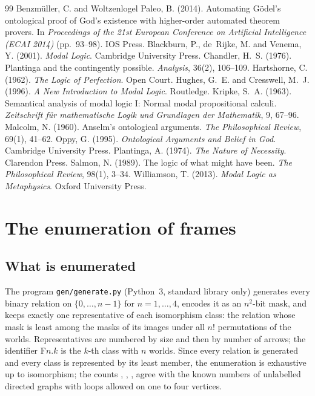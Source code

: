 \documentclass{situationist-preprint}
\begin{document}
\begin{thebibliography}{99}\small
{} Benzmüller, C. and Woltzenlogel Paleo, B. (2014). Automating Gödel's ontological proof of God's existence with higher-order automated theorem provers. In \emph{Proceedings of the 21st European Conference on Artificial Intelligence (ECAI 2014)} (pp.~93--98). IOS Press.
 Blackburn, P., de~Rijke, M. and Venema, Y. (2001). \emph{Modal Logic}. Cambridge University Press.
 Chandler, H.~S. (1976). Plantinga and the contingently possible. \emph{Analysis}, 36(2), 106--109.
 Hartshorne, C. (1962). \emph{The Logic of Perfection}. Open Court.
 Hughes, G.~E. and Cresswell, M.~J. (1996). \emph{A New Introduction to Modal Logic}. Routledge.
 Kripke, S.~A. (1963). Semantical analysis of modal logic I: Normal modal propositional calculi. \emph{Zeitschrift für mathematische Logik und Grundlagen der Mathematik}, 9, 67--96.
 Malcolm, N. (1960). Anselm's ontological arguments. \emph{The Philosophical Review}, 69(1), 41--62.
 Oppy, G. (1995). \emph{Ontological Arguments and Belief in God}. Cambridge University Press.
 Plantinga, A. (1974). \emph{The Nature of Necessity}. Clarendon Press.
 Salmon, N. (1989). The logic of what might have been. \emph{The Philosophical Review}, 98(1), 3--34.
 Williamson, T. (2013). \emph{Modal Logic as Metaphysics}. Oxford University Press.
\end{thebibliography}

\clearpage
\appendix
\section{The enumeration of frames}\label{app:method}

\subsection{What is enumerated}

The program \texttt{gen/generate.py} (Python~3, standard library only) generates every binary relation on $\{0, \ldots, n-1\}$ for $n = 1, \ldots, 4$, encodes it as an $n^2$-bit mask, and keeps exactly one representative of each isomorphism class: the relation whose mask is least among the masks of its images under all $n!$ permutations of the worlds. Representatives are numbered by size and then by number of arrows; the identifier F$n$.$k$ is the $k$-th class with $n$ worlds. Since every relation is generated and every class is represented by its least member, the enumeration is exhaustive up to isomorphism; the counts \stNOne, \stNTwo, \stNThree, \stNFour{} agree with the known numbers of unlabelled directed graphs with loops allowed on one to four vertices.
\end{document}
